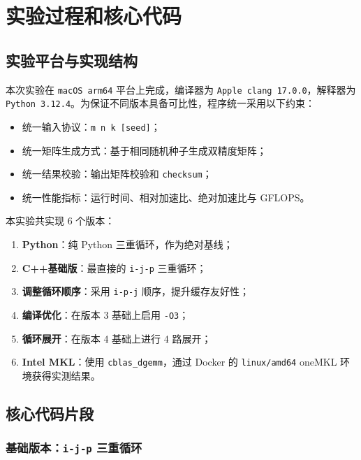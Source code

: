 \documentclass[UTF8,a4paper,12pt]{ctexart}
\begin{document}
\section{实验过程和核心代码}

\subsection{实验平台与实现结构}

本次实验在 \texttt{macOS arm64} 平台上完成，编译器为 \texttt{Apple clang 17.0.0}，解释器为 \texttt{Python 3.12.4}。为保证不同版本具备可比性，程序统一采用以下约束：

\begin{itemize}[leftmargin=2.2em]
  \item 统一输入协议：\texttt{m n k [seed]}；
  \item 统一矩阵生成方式：基于相同随机种子生成双精度矩阵；
  \item 统一结果校验：输出矩阵校验和 \texttt{checksum}；
  \item 统一性能指标：运行时间、相对加速比、绝对加速比与 GFLOPS。
\end{itemize}

本实验共实现 6 个版本：

\begin{enumerate}[leftmargin=2.2em]
  \item \textbf{Python}：纯 Python 三重循环，作为绝对基线；
  \item \textbf{C++基础版}：最直接的 \texttt{i-j-p} 三重循环；
  \item \textbf{调整循环顺序}：采用 \texttt{i-p-j} 顺序，提升缓存友好性；
  \item \textbf{编译优化}：在版本 3 基础上启用 \texttt{-O3}；
  \item \textbf{循环展开}：在版本 4 基础上进行 4 路展开；
  \item \textbf{Intel MKL}：使用 \texttt{cblas\_dgemm}，通过 Docker 的 \texttt{linux/amd64} oneMKL 环境获得实测结果。
\end{enumerate}

\subsection{核心代码片段}

\subsubsection{基础版本：\texttt{i-j-p} 三重循环}
\end{document}
